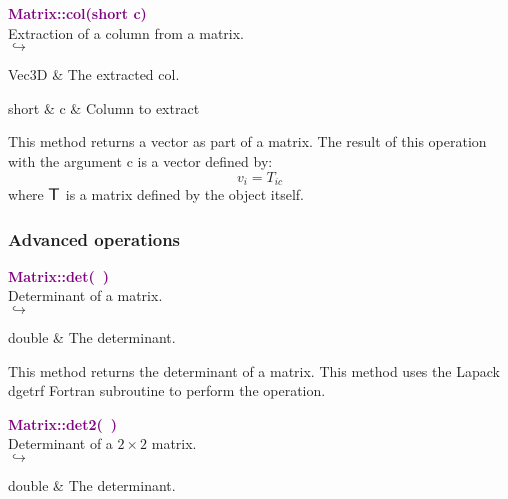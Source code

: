 \textcolor{purple}{\textbf{Matrix::col(short c)}}\label{Matrix::col(short c)}\\
Extraction of a column from a matrix.\\ \hspace*{5mm}$\hookrightarrow$
\vspace*{-2em}\begin{tcolorbox}[grow to left by=-1cm, width=\textwidth-1cm,myArgs,tabularx={l|R}]
Vec3D & The extracted col.
\end{tcolorbox}

\begin{tcolorbox}[width=\textwidth,myArgs,tabularx={ll|R}]
short & c & Column to extract
\end{tcolorbox}

This method returns a vector as part of a matrix.
The result of this operation with the argument c is a vector defined by:
\begin{equation*}
v_{i} = T_{ic}
\end{equation*}
where $\mbox{\large\ensuremath{\mathsf{T}}}$ is a matrix defined by the object itself.

\subsubsection{Advanced operations}

\textcolor{purple}{\textbf{Matrix::det(~)}}\label{Matrix::det()}\\
Determinant of a matrix.\\ \hspace*{5mm}$\hookrightarrow$
\vspace*{-2em}\begin{tcolorbox}[grow to left by=-1cm, width=\textwidth-1cm,myArgs,tabularx={l|R}]
double & The determinant.
\end{tcolorbox}

This method returns the determinant of a matrix.
This method uses the Lapack \textsf{dgetrf} Fortran subroutine to perform the operation.

\textcolor{purple}{\textbf{Matrix::det2(~)}}\label{Matrix::det2()}\\
Determinant of a $2 \times 2$ matrix.\\ \hspace*{5mm}$\hookrightarrow$
\vspace*{-2em}\begin{tcolorbox}[grow to left by=-1cm, width=\textwidth-1cm,myArgs,tabularx={l|R}]
double & The determinant.
\end{tcolorbox}

